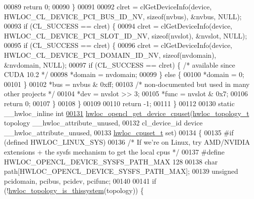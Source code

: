 \begin{DoxyCode}
00089                 \textcolor{keywordflow}{return} 0;
00090         \}
00091 
00092         clret = clGetDeviceInfo(device, HWLOC\_CL\_DEVICE\_PCI\_BUS\_ID\_NV, \textcolor{keyword}{sizeof}(nvbus), &nvbus, NULL);
00093         \textcolor{keywordflow}{if} (CL\_SUCCESS == clret) \{
00094                 clret = clGetDeviceInfo(device, HWLOC\_CL\_DEVICE\_PCI\_SLOT\_ID\_NV, \textcolor{keyword}{sizeof}(nvslot), &nvslot, 
      NULL);
00095                 \textcolor{keywordflow}{if} (CL\_SUCCESS == clret) \{
00096                         clret = clGetDeviceInfo(device, HWLOC\_CL\_DEVICE\_PCI\_DOMAIN\_ID\_NV, \textcolor{keyword}{sizeof}(nvdomain),
       &nvdomain, NULL);
00097                         \textcolor{keywordflow}{if} (CL\_SUCCESS == clret) \{ \textcolor{comment}{/* available since CUDA 10.2 */}
00098                                 *domain = nvdomain;
00099                         \} \textcolor{keywordflow}{else} \{
00100                                 *domain = 0;
00101                         \}
00102                         *bus = nvbus & 0xff;
00103                         \textcolor{comment}{/* non-documented but used in many other projects */}
00104                         *dev = nvslot >> 3;
00105                         *func = nvslot & 0x7;
00106                         \textcolor{keywordflow}{return} 0;
00107                 \}
00108         \}
00109 
00110         \textcolor{keywordflow}{return} -1;
00111 \}
00112 
00130 \textcolor{keyword}{static} \_\_hwloc\_inline \textcolor{keywordtype}{int}
\hyperlink{a00218_gacc32737d4648d16b0d292438f210ec90}{00131} \hyperlink{a00218_gacc32737d4648d16b0d292438f210ec90}{hwloc\_opencl\_get\_device\_cpuset}(\hyperlink{a00186_ga9d1e76ee15a7dee158b786c30b6a6e38}{hwloc\_topology\_t} topology 
      \_\_hwloc\_attribute\_unused,
00132                                cl\_device\_id device \_\_hwloc\_attribute\_unused,
00133                                \hyperlink{a00183_ga4bbf39b68b6f568fb92739e7c0ea7801}{hwloc\_cpuset\_t} \textcolor{keyword}{set})
00134 \{
00135 \textcolor{preprocessor}{#if (defined HWLOC\_LINUX\_SYS)}
00136         \textcolor{comment}{/* If we're on Linux, try AMD/NVIDIA extensions + the sysfs mechanism to get the local cpus */}
00137 \textcolor{preprocessor}{#define HWLOC\_OPENCL\_DEVICE\_SYSFS\_PATH\_MAX 128}
00138         \textcolor{keywordtype}{char} path[HWLOC\_OPENCL\_DEVICE\_SYSFS\_PATH\_MAX];
00139         \textcolor{keywordtype}{unsigned} pcidomain, pcibus, pcidev, pcifunc;
00140 
00141         \textcolor{keywordflow}{if} (!\hyperlink{a00193_ga68ffdcfd9175cdf40709801092f18017}{hwloc\_topology\_is\_thissystem}(topology)) \{

\end{DoxyCode}
